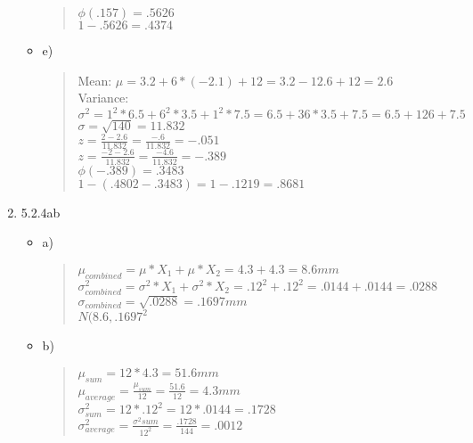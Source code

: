 \documentclass{article}
\begin{document}
\begin{enumerate}
\begin{itemize}
\begin{quote}
                $\phi(.157) = .5626$ \\
                $1-.5626 = .4374$
            \end{quote}
        \end{itemize}
        \begin{itemize}
            \item e)
            \begin{quote}
                Mean: $\mu = 3.2+6*(-2.1)+12 = 3.2-12.6+12 = 2.6$ \\
                Variance: $\sigma^{2} = 1^{2}*6.5+6^{2}*3.5+1^{2}*7.5 = 6.5+36*3.5+7.5 = 6.5+126+7.5$ \\
                $\sigma = \sqrt{140} = 11.832$ \\
                $z = \frac{2-2.6}{11.832} = \frac{-.6}{11.832} = -.051$ \\
                $z = \frac{-2-2.6}{11.832} = \frac{-4.6}{11.832} = -.389$ \\
                $\phi(-.389) = .3483$ \\
                $1-(.4802-.3483) = 1-.1219 = .8681$
            \end{quote}
        \end{itemize}
    \item 5.2.4ab 
        \begin{itemize}
            \item a)
            \begin{quote}
                $\mu_{combined} = \mu*X_{1} + \mu*X_{2} = 4.3+4.3 = 8.6mm$ \\
                $ \sigma^{2}_{combined} = \sigma^{2}*X_{1}+\sigma^{2}*X_{2} = .12^{2}+.12^{2} = .0144+.0144 = .0288$ \\
                $\sigma_{combined} = \sqrt{.0288} = .1697mm$ \\
                $N(8.6,.1697^{2}$
            \end{quote}
        \end{itemize}
        \begin{itemize}
            \item b)
            \begin{quote}
                $\mu_{sum} = 12*4.3 = 51.6mm$ \\
                $\mu_{average} = \frac{\mu_{sum}}{12} = \frac{51.6}{12} = 4.3 mm$ \\
                $\sigma^{2}_{sum} = 12*.12^{2} = 12*.0144 = .1728$ \\
                $\sigma^{2}_{average} = \frac{\sigma^{2}sum}{12^{2}} = \frac{.1728}{144} = .0012$ \\

\end{quote}
\end{itemize}
\end{enumerate}
\end{document}
